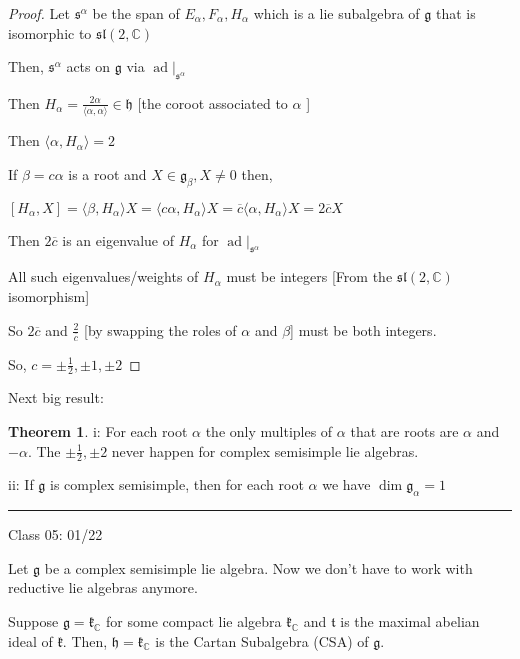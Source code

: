 \documentclass{article}
\theoremstyle{definition}
\newtheorem{theorem}{Theorem}
\begin{document}
\begin{proof}
    Let \(\mathfrak{s}^\alpha\) be the span of \(E_\alpha ,F_\alpha ,H_\alpha \) which is a lie subalgebra of \(\mathfrak{g} \) that is isomorphic to \(\mathfrak{sl}(2,\mathbb{C} ) \)
    
    Then, \(\mathfrak{s}^\alpha \) acts on \(\mathfrak{g} \) via \(\operatorname{ad}|_{\mathfrak{s}^\alpha} \)  

    Then \(H_\alpha =\frac{2\alpha}{\langle \alpha ,\alpha  \rangle }\in \mathfrak{h} \) [the coroot associated to \(\alpha \) ]

    Then \(\langle \alpha ,H_\alpha  \rangle =2\)
    
    If \(\beta =c \alpha \) is a root and \(X\in \mathfrak{g}_\beta ,X\neq 0 \) then,
    
    \([H_\alpha ,X]= \langle \beta ,H_\alpha  \rangle X = \langle c \alpha ,H_\alpha  \rangle X=\overline{c} \langle \alpha ,H_\alpha  \rangle X=2\overline{c} X\) 

    Then \(2\overline{c} \) is an eigenvalue of \(H_\alpha \) for \(\operatorname{ad}|_{\mathfrak{s} ^\alpha } \) 

    All such eigenvalues/weights of \(H_\alpha \) must be integers [From the \(\mathfrak{sl}(2,\mathbb{C} ) \) isomorphism]

    So \(2\overline{c} \) and \(\frac{2}{\overline{c} }\) [by swapping the roles of \(\alpha\) and \(\beta\)] must be both integers.

    So, \(c=\pm\frac{1}{2},\pm 1,\pm 2\)

\end{proof}

Next big result:

\begin{theorem}
    i: For each root \(\alpha\) the only multiples of \(\alpha \) that are roots are \(\alpha \) and \(-\alpha \). The \(\pm \frac{1}{2},\pm 2\) never happen for complex semisimple lie algebras.
    
    ii: If \(\mathfrak{g} \) is complex semisimple, then for each root \(\alpha \) we have \(\dim \mathfrak{g}_\alpha   =1 \) 

\end{theorem}

\hfil
\hrule

Class 05: 01/22

Let \(\mathfrak{g} \) be a complex semisimple lie algebra. Now we don't have to work with reductive lie algebras anymore.

Suppose \(\mathfrak{g} =\mathfrak{k} _\mathbb{C} \) for some compact lie algebra \(\mathfrak{k} _\mathbb{C} \) and \(\mathfrak{t} \) is the maximal abelian ideal of \(\mathfrak{k} \). Then, \(\mathfrak{h} =\mathfrak{k} _\mathbb{C} \) is the Cartan Subalgebra (CSA) of \(\mathfrak{g} \).
\end{document}
